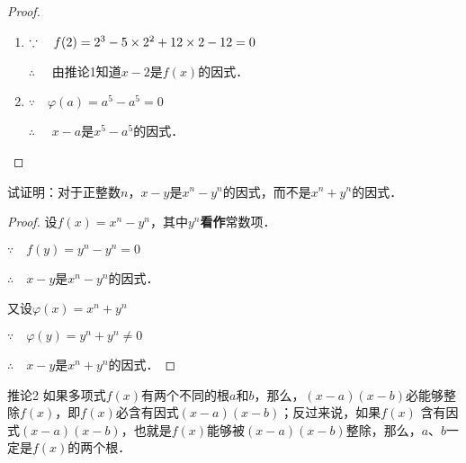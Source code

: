 \begin{proof}
\begin{enumerate}
    \item $\because\quad f(2)=2^3-5\times 2^2+12\times2-12=0$
    
    $\therefore\quad $ 由推论1知道$x-2$是$f(x)$的因式．
    \item $\because\quad \varphi(a)=a^5-a^5=0$
    
    $\therefore\quad $ $x-a$是$x^5-a^5$的因式．
\end{enumerate}

\end{proof}

\begin{example}
试证明：对于正整数$n$，$x-y$是$x^n-y^n$的因式，而不是$x^n+y^n$的因式．
\end{example}

\begin{proof}
设$f(x)=x^n-y^n$，其中$y^n$\textbf{看作}常数项．

$\because\quad f (y) =y^n -y^n=0$

$\therefore\quad x-y$是$x^n-y^n$的因式．

又设$\varphi(x)=x^n+y^n$

$\because\quad \varphi(y) =y^n +y^n\ne 0$

$\therefore\quad x-y$是$x^n+y^n$的因式．
\end{proof}

\begin{blk}{推论2}
如果多项式$f(x)$有两个不同的根$a$和$b$，那么，$(x-a)(x-b)$必能够整除$f(x)$，即$f(x)$必含有因式$(x-a)(x-b)$；反过来说，如果$f(x)$ 含有因式$(x-a)(x-b)$，也就是$f(x)$能够被$(x-a)(x-b)$整除，那么，$a$、$b$一定是$f(x)$的两个根．
\end{blk}

